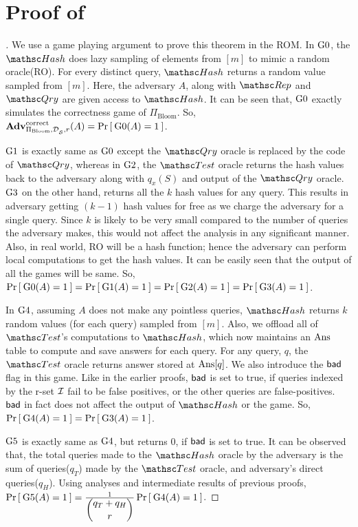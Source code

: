 \section{Proof of }
\label{sec:thm3_fp}
\begin{proof}[]
We use a game playing argument to prove this theorem in the ROM. In $\text{G0}$, the $\Hash$ does lazy sampling of elements from $[m]$ to mimic a random oracle(RO). For every distinct query, $\Hash$ returns a random value sampled from $[m]$. Here, the adversary $A$, along with $\Rep$ and $\Qry$ are given access to $\Hash$. It can be seen that, $\text{G0}$ exactly simulates the correctness game of $\Pi_{\mathrm{Bloom}}$. So, $\mathrm{\mathbf{Adv}}^{\mathrm{correct}}_{\Pi_{\mathrm{Bloom}},\mathcal{D}_{{\cal S}}^{},r}(A) = \Pr\left[\: \text{G0}(A) = 1 \:\right]$.

$\text{G1}$ is exactly same as $\text{G0}$ except the $\Qry$ oracle is replaced by the code of $\Qry$, whereas in $\text{G2}$, the $\Test$ oracle returns the hash values back to the adversary along with $q_x(S)$ and output of the $\Qry$ oracle. $\text{G3}$ on the other hand, returns all the $k$ hash values for any query. This results in adversary getting $(k-1)$ hash values for free as we charge the adversary for a single query. Since $k$ is likely to be very small compared to the number of queries the adversary makes, this would not affect the analysis in any significant manner. Also, in real world, RO will be a hash function; hence the adversary can perform local computations to get the hash values. It can be easily seen that the output of all the games will be same. So, $\Pr\left[\: \text{G0}(A) = 1 \:\right] = \Pr\left[\: \text{G1}(A) = 1 \:\right] = \Pr\left[\: \text{G2}(A) = 1 \:\right] = \Pr\left[\: \text{G3}(A) = 1 \:\right]$. 

In $\text{G4}$, assuming $A$ does not make any pointless queries, $\Hash$ returns $k$ random values (for each query) sampled from $[m]$. Also, we offload all of $\Test$'s computations to $\Hash$, which now maintains an $\mathrm{Ans}$ table to compute and save answers for each query.  For any query, $q$, the $\Test$ oracle returns answer stored at $\mathrm{Ans}[q]$. We also introduce the $\mathsf{bad}$ flag in this game. Like in the earlier proofs,  $\mathsf{bad}$ is set to true, if queries indexed by the r-set ${\cal I}$ fail to be false positives, or the other queries are false-positives. $\mathsf{bad}$ in fact does not affect the output of $\Hash$ or the game. So, $\Pr\left[\: \text{G4}(A) = 1 \:\right] = \Pr\left[\: \text{G3}(A) = 1 \:\right]$. 

$\text{G5}$ is exactly same as $\text{G4}$, but returns 0, if $\mathsf{bad}$ is set to true. It can be observed that, the total queries made to the $\Hash$ oracle by the adversary is the sum of queries($q_T$) made by the $\Test$ oracle, and adversary's direct queries($q_H$). Using analyses and intermediate results of previous proofs, $\Pr\left[\: \text{G5}(A)=1 \:\right] = \frac{1}{\dbinom{q_T + q_H}{r}}\Pr\left[\: \text{G4}(A)=1 \:\right]$.


\end{proof}
